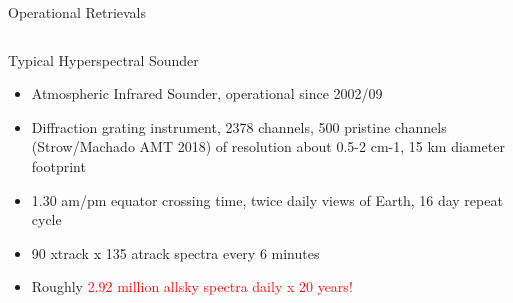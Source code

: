 \documentclass[10pt,t]{beamer}
\begin{document}
\begin{frame}[shrink=2]{Operational Retrievals}
\vspace{-0.11in}
\begin{columns}

\begin{column}{0.55\columnwidth}
\begin{block}{Typical Hyperspectral Sounder}
  \begin{itemize}
  \item Atmospheric Infrared Sounder, operational since 2002/09
  \item Diffraction grating instrument, 2378 channels, 500 pristine channels 
        (Strow/Machado AMT 2018) of resolution about 0.5-2 cm-1, 15 km diameter footprint
  \item 1.30 am/pm equator crossing time, twice daily views of Earth, 16 day repeat cycle
  \item 90 xtrack x 135 atrack spectra every 6 minutes
  \item Roughly \textcolor{red}{2.92 million  allsky spectra daily x 20 years!}
  \end{itemize}
\end{block}
\end{column}


\end{columns}
\end{frame}
\end{document}
